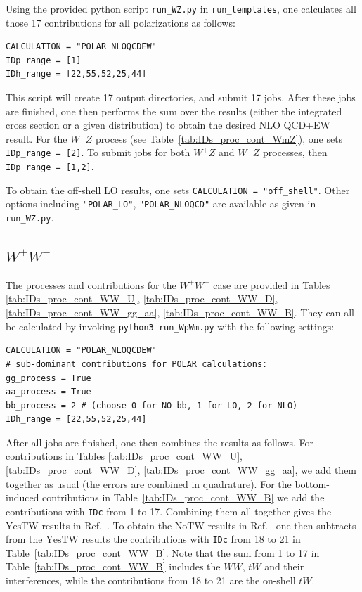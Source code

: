 \documentclass[english,12pt]{article}
\newcommand{\tab}[1]{Table~\ref{#1}}
\newcommand{\bib}[1]{Ref.~\cite{#1}}
\begin{document}
Using the provided python script {\tt run\_WZ.py} in {\tt run\_templates}, one calculates all those 17 contributions for all polarizations as follows:
\begin{verbatim}
CALCULATION = "POLAR_NLOQCDEW"
IDp_range = [1]
IDh_range = [22,55,52,25,44]
\end{verbatim}
This script will create 17 output directories, 
and submit 17 jobs. After these jobs are finished, one then performs the sum over the results (either 
the integrated cross section or a given distribution) to obtain the desired NLO QCD+EW result.
For the $W^-Z$ process (see \tab{tab:IDs_proc_cont_WmZ}), one sets {\tt IDp\_range = [2]}. To submit jobs for both $W^+Z$ and $W^-Z$ processes, 
then {\tt IDp\_range = [1,2]}. 

To obtain the off-shell LO results, one sets {\tt CALCULATION = "off\_shell"}. Other options including {\tt "POLAR\_LO"}, {\tt "POLAR\_NLOQCD"} 
are available as given in {\tt run\_WZ.py}.
\subsection{$W^+W^-$}
\label{sec:cal_xs_WW}
The processes and contributions for the $W^+W^-$ case are provided in Tables \ref{tab:IDs_proc_cont_WW_U}, \ref{tab:IDs_proc_cont_WW_D}, 
\ref{tab:IDs_proc_cont_WW_gg_aa}, \ref{tab:IDs_proc_cont_WW_B}. 
They can all be calculated by invoking {\tt python3 run\_WpWm.py} with the following settings:
\begin{verbatim}
CALCULATION = "POLAR_NLOQCDEW"
# sub-dominant contributions for POLAR calculations:
gg_process = True
aa_process = True
bb_process = 2 # (choose 0 for NO bb, 1 for LO, 2 for NLO)
IDh_range = [22,55,52,25,44]
\end{verbatim}
After all jobs are finished, one then combines the results as follows. 
For contributions in Tables \ref{tab:IDs_proc_cont_WW_U}, \ref{tab:IDs_proc_cont_WW_D}, 
\ref{tab:IDs_proc_cont_WW_gg_aa}, we add them together as usual (the errors are combined in quadrature). 
For the bottom-induced contributions in \tab{tab:IDs_proc_cont_WW_B} we add the contributions with {\tt IDc} from 1 to 17. 
Combining them all together gives the $\text{YesTW}$ results in \bib{Dao:2024ffg}.
To obtain the $\text{NoTW}$ results in \bib{Dao:2024ffg} one then subtracts from the $\text{YesTW}$ results
the contributions with {\tt IDc} from 18 to 21 in \tab{tab:IDs_proc_cont_WW_B}.   
Note that the sum from 1 to 17 in \tab{tab:IDs_proc_cont_WW_B} includes the $WW$, $tW$ and their interferences, 
while the contributions from 18 to 21 are the on-shell $tW$.
\end{document}
